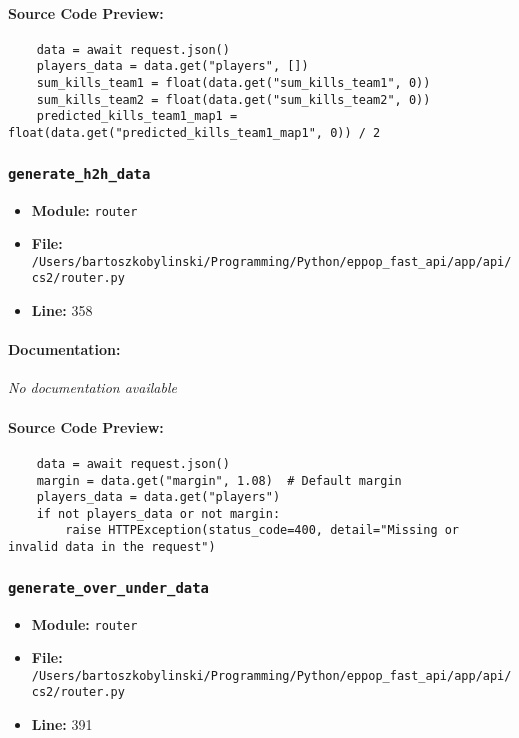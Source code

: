 \documentclass[11pt,a4paper]{article}
\begin{document}
\paragraph{Source Code Preview:}
\begin{verbatim}
    data = await request.json()
    players_data = data.get("players", [])
    sum_kills_team1 = float(data.get("sum_kills_team1", 0))
    sum_kills_team2 = float(data.get("sum_kills_team2", 0))
    predicted_kills_team1_map1 = float(data.get("predicted_kills_team1_map1", 0)) / 2
\end{verbatim}

\vspace{1em}
\subsubsection{\texttt{generate\_h2h\_data}}

\begin{itemize}
    \item \textbf{Module:} \texttt{router}
    \item \textbf{File:} \texttt{/Users/bartoszkobylinski/Programming/Python/eppop\_fast\_api/app/api/cs2/router.py}
    \item \textbf{Line:} 358
\end{itemize}

\paragraph{Documentation:} \textit{No documentation available}

\paragraph{Source Code Preview:}
\begin{verbatim}
    data = await request.json()
    margin = data.get("margin", 1.08)  # Default margin
    players_data = data.get("players")
    if not players_data or not margin:
        raise HTTPException(status_code=400, detail="Missing or invalid data in the request")
\end{verbatim}

\vspace{1em}
\subsubsection{\texttt{generate\_over\_under\_data}}

\begin{itemize}
    \item \textbf{Module:} \texttt{router}
    \item \textbf{File:} \texttt{/Users/bartoszkobylinski/Programming/Python/eppop\_fast\_api/app/api/cs2/router.py}
    \item \textbf{Line:} 391
\end{itemize}
\end{document}
